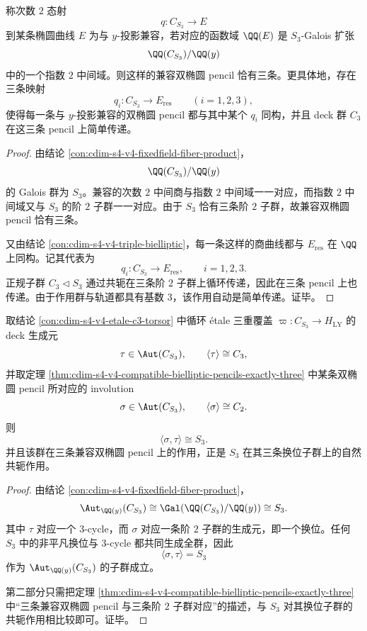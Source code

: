 \begin{theorem}\label{thm:cdim-s4-v4-compatible-bielliptic-pencils-exactly-three}
称次数 \(2\) 态射
\[
q:C_{S_3}\longrightarrow E
\]
到某条椭圆曲线 \(E\) 为与 \(y\)-投影兼容，若对应的函数域 \(\QQ(E)\) 是 \(S_3\)-Galois 扩张
\[
\QQ(C_{S_3})/\QQ(y)
\]
中的一个指数 \(2\) 中间域。则这样的兼容双椭圆 pencil 恰有三条。更具体地，存在三条映射
\[
q_i:C_{S_3}\longrightarrow E_{\mathrm{res}}
\qquad (i=1,2,3),
\]
使得每一条与 \(y\)-投影兼容的双椭圆 pencil 都与其中某个 \(q_i\) 同构，并且 deck 群 \(C_3\) 在这三条 pencil 上简单传递。
\end{theorem}
\begin{proof}
由结论 \ref{con:cdim-s4-v4-fixedfield-fiber-product}，
\[
\QQ(C_{S_3})/\QQ(y)
\]
的 Galois 群为 \(S_3\)。兼容的次数 \(2\) 中间商与指数 \(2\) 中间域一一对应，而指数 \(2\) 中间域又与 \(S_3\) 的阶 \(2\) 子群一一对应。由于 \(S_3\) 恰有三条阶 \(2\) 子群，故兼容双椭圆 pencil 恰有三条。

又由结论 \ref{con:cdim-s4-v4-triple-bielliptic}，每一条这样的商曲线都与 \(E_{\mathrm{res}}\) 在 \(\QQ\) 上同构。记其代表为
\[
q_i:C_{S_3}\to E_{\mathrm{res}},\qquad i=1,2,3.
\]
正规子群 \(C_3\triangleleft S_3\) 通过共轭在三条阶 \(2\) 子群上循环传递，因此在三条 pencil 上也传递。由于作用群与轨道都具有基数 \(3\)，该作用自动是简单传递。证毕。
\end{proof}

\begin{theorem}\label{thm:cdim-s4-v4-deck-and-bielliptic-involution-generate-s3}
取结论 \ref{con:cdim-s4-v4-etale-c3-torsor} 中循环 étale 三重覆盖 \(\varpi:C_{S_3}\to H_{\mathrm{LY}}\) 的 deck 生成元
\[
\tau\in \Aut(C_{S_3}),
\qquad
\langle\tau\rangle\cong C_3,
\]
并取定理 \ref{thm:cdim-s4-v4-compatible-bielliptic-pencils-exactly-three} 中某条双椭圆 pencil 所对应的 involution
\[
\sigma\in \Aut(C_{S_3}),
\qquad
\langle\sigma\rangle\cong C_2.
\]
则
\[
\langle \sigma,\tau\rangle\cong S_3.
\]
并且该群在三条兼容双椭圆 pencil 上的作用，正是 \(S_3\) 在其三条换位子群上的自然共轭作用。
\end{theorem}
\begin{proof}
由结论 \ref{con:cdim-s4-v4-fixedfield-fiber-product}，
\[
\Aut_{\QQ(y)}(C_{S_3})\cong \Gal(\QQ(C_{S_3})/\QQ(y))\cong S_3.
\]
其中 \(\tau\) 对应一个 \(3\)-cycle，而 \(\sigma\) 对应一条阶 \(2\) 子群的生成元，即一个换位。任何 \(S_3\) 中的非平凡换位与 \(3\)-cycle 都共同生成全群，因此
\[
\langle \sigma,\tau\rangle=S_3
\]
作为 \(\Aut_{\QQ(y)}(C_{S_3})\) 的子群成立。

第二部分只需把定理 \ref{thm:cdim-s4-v4-compatible-bielliptic-pencils-exactly-three} 中“三条兼容双椭圆 pencil 与三条阶 \(2\) 子群对应”的描述，与 \(S_3\) 对其换位子群的共轭作用相比较即可。证毕。
\end{proof}

